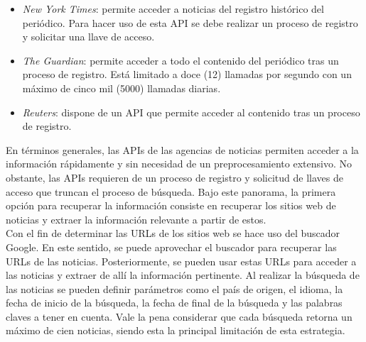 \begin{itemize}
    \item \textit{New York Times}: permite acceder a noticias del registro histórico del periódico. Para hacer uso de esta API se debe realizar un proceso de registro y solicitar una llave de acceso.
    
    \item \textit{The Guardian}: permite acceder a todo el contenido del periódico tras un proceso de registro. Está limitado a doce (12) llamadas por segundo con un máximo de cinco mil (5000) llamadas diarias.
    
    \item \textit{Reuters}: dispone de un API que permite acceder al contenido tras un proceso de registro.
\end{itemize}

En términos generales, las APIs de las agencias de noticias permiten acceder a la información rápidamente y sin necesidad de un preprocesamiento extensivo. No obstante, las APIs requieren de un proceso de registro y solicitud de llaves de acceso que truncan el proceso de búsqueda. Bajo este panorama, la primera opción para recuperar la información consiste en recuperar los sitios web de noticias y extraer la información relevante a partir de estos. \\

Con el fin de determinar las URLs de los sitios web se hace uso del buscador Google. En este sentido, se puede aprovechar el buscador para recuperar las URLs de las noticias. Posteriormente, se pueden usar estas URLs para acceder a las noticias y extraer de allí la información pertinente. Al realizar la búsqueda de las noticias se pueden definir parámetros como el país de origen, el idioma, la fecha de inicio de la búsqueda, la fecha de final de la búsqueda y las palabras claves a tener en cuenta. Vale la pena considerar que cada búsqueda retorna un máximo de cien noticias, siendo esta la principal limitación de esta estrategia.